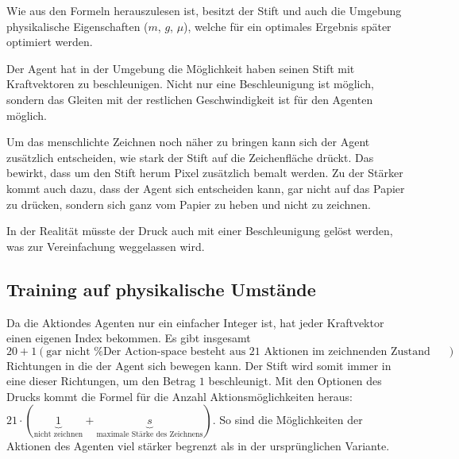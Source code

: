 Wie aus den Formeln herauszulesen ist, besitzt der Stift und auch die Umgebung
physikalische Eigenschaften ($m$, $g$, $\mu$), welche für ein optimales Ergebnis
später optimiert werden.

Der Agent hat in der Umgebung die Möglichkeit haben seinen Stift mit
Kraftvektoren zu beschleunigen. Nicht nur eine Beschleunigung ist möglich,
sondern das Gleiten mit der restlichen Geschwindigkeit ist für den Agenten
möglich.

Um das menschlichte Zeichnen noch näher zu bringen kann sich der Agent
zusätzlich entscheiden, wie stark der Stift auf die Zeichenfläche drückt. Das
bewirkt, dass um den Stift herum Pixel zusätzlich bemalt werden. Zu der Stärker
kommt auch dazu, dass der Agent sich entscheiden kann, gar nicht auf das Papier
zu drücken, sondern sich ganz vom Papier zu heben und nicht zu zeichnen.

In der Realität müsste der Druck auch mit einer Beschleunigung gelöst werden,
was zur Vereinfachung weggelassen wird.

\subsection*{Training auf physikalische Umstände}



Da die Aktiondes Agenten nur ein einfacher Integer ist, hat jeder Kraftvektor
einen eigenen Index bekommen. Es gibt insgesamt $20 + 1 (\text{gar nicht     %
bewegen})$ Richtungen in die der Agent sich bewegen kann. Der Stift wird somit %
immer in eine dieser Richtungen, um den Betrag $1$ beschleunigt. Mit den
Optionen des Drucks kommt die Formel für die Anzahl Aktionsmöglichkeiten heraus:
$21\cdot(\underbrace{1}_{\text{nicht zeichnen}} + \underbrace{s}_{\text{maximale
Stärke des Zeichnens}})$. So sind die Möglichkeiten der Aktionen des Agenten
viel stärker begrenzt als in der ursprünglichen Variante. %

